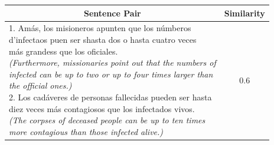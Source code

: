 \begin{enumerate}
\begin{table}[ht!]
	\centering
		\begin{tabular}{l|c}
			\hline
			\multicolumn{1}{c|}{\textbf{Sentence Pair}} & 
			\multicolumn{1}{c}{\textbf{Similarity}}  \\
			\hline
			\makecell[l]{1. Amás, los misioneros apunten que los númberos \\ d'infectaos puen ser shasta dos o hasta cuatro veces \\ más grandess que los oficiales. \\
				\textit{(Furthermore, missionaries point out that the numbers of } \\ \textit{infected can be up to two or up to four times larger than} \\ \textit{the official ones.)} \\ 
				2. Los cadáveres de personas fallecidas pueden ser hasta \\ diez veces más contagiosos que los infectados vivos. \\ 
			\textit{(The corpses of deceased people can be up to ten times } \\ \textit{more contagious than those infected alive.)}} & 0.6  \\

\end{tabular}
\end{table}
\end{enumerate}
